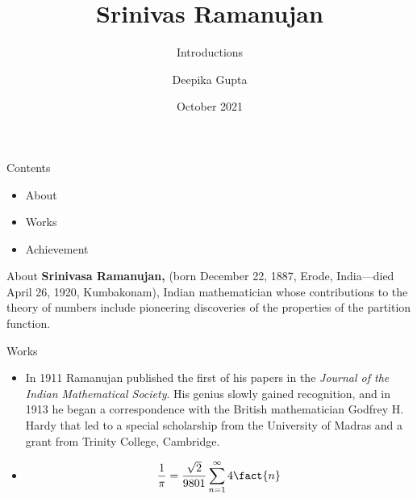 \documentclass{beamer}
\title{Srinivas Ramanujan}
\author{Deepika Gupta }
\institute{Ramanujan College}
\date{October 2021}
\begin{document}
\maketitle
\subtitle{Introductions}
\begin{frame}{Contents}
 \begin{itemize}
     \item About
     \item Works
     \item Achievement
 \end{itemize}
\end{frame}
\begin{frame}{About}
 \textbf{Srinivasa Ramanujan,} (born December 22, 1887, Erode, India—died April 26, 1920, Kumbakonam), Indian mathematician whose contributions to the theory of numbers include pioneering discoveries of the properties of the partition function.
\end{frame}
\begin{frame}{Works}
\begin{itemize}
    \item In 1911 Ramanujan published the first of his papers in the \textit {Journal of the Indian Mathematical Society}. His genius slowly gained recognition, and in 1913 he began a correspondence with the British mathematician Godfrey H. Hardy that led to a special scholarship from the University of Madras and a grant from Trinity College, Cambridge.
    \item 
    \begin{equation}
      \frac{1}{\pi}=\frac{\sqrt{2}}{9801} \sum_{n=1}^{\infty}{4 \fact{n}}
    \end{equation}
 \end{itemize}
\end{frame}
\end{document}
